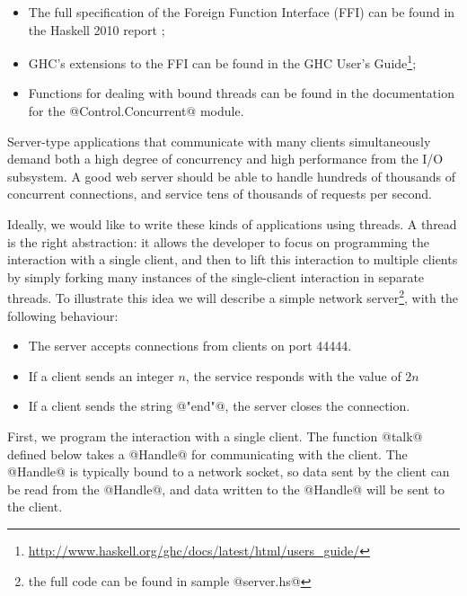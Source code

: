 
\begin{itemize}
\item The full specification of the Foreign Function Interface (FFI)
  can be found in the Haskell 2010 report \cite{haskell2010};
\item GHC's extensions to the FFI can be found in the GHC User's
  Guide\footnote{\url{http://www.haskell.org/ghc/docs/latest/html/users_guide/}};
\item Functions for dealing with bound threads can be found in the
  documentation for the @Control.Concurrent@ module.
\end{itemize}


Server-type applications that communicate with many clients
simultaneously demand both a high degree of concurrency and high
performance from the I/O subsystem.  A good web server should be able
to handle hundreds of thousands of concurrent connections, and service
tens of thousands of requests per second.

Ideally, we would like to write these kinds of applications using
threads.  A thread is the right abstraction: it allows the developer
to focus on programming the interaction with a single client, and then
to lift this interaction to multiple clients by simply forking many
instances of the single-client interaction in separate threads.  To
illustrate this idea we will describe a simple network
server\footnote{the full code can be found in sample @server.hs@},
with the following behaviour:

\begin{itemize}
\item The server accepts connections from clients on port 44444.
\item If a client sends an integer $n$, the service responds with the value of
  $2n$
\item If a client sends the string @"end"@, the server closes the
  connection.
\end{itemize}

First, we program the interaction with a single client.  The function
@talk@ defined below takes a @Handle@ for communicating with the
client.  The @Handle@ is typically bound to a network socket, so data
sent by the client can be read from the @Handle@, and data written to
the @Handle@ will be sent to the client.

